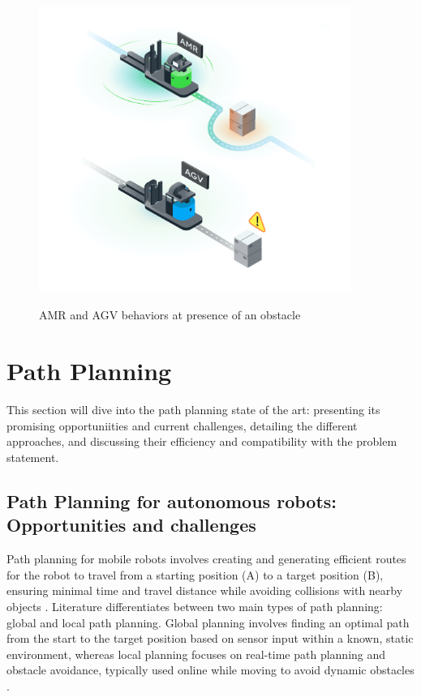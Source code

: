 \begin{figure}[H]
    \begin{center}
       \includegraphics[width=4in]{images/Chap1/AMR-VS-AGV.png}\\
       \caption{AMR and AGV behaviors at presence of an obstacle \cite{R9}}
       \label{AMR-VS-AGV}
       \end{center}
\end{figure}


\newpage
\section{Path Planning}
This section will dive into the path planning state of the art: presenting its promising 
opportuniities and current challenges, detailing the different approaches, and discussing
their efficiency and compatibility with the problem statement.

\subsection{Path Planning for autonomous robots: Opportunities and challenges}
Path planning for mobile robots involves creating and generating efficient routes 
for the robot to travel from a starting position (A) to a target position (B), 
ensuring minimal time and travel distance while avoiding collisions with nearby objects \cite{R7}. Literature 
differentiates between two main types of path planning: 
global and local path planning. Global planning involves finding an optimal path from 
the start to the target position based on sensor input within a known, static environment, 
whereas local planning focuses on real-time path planning and obstacle avoidance, typically used online while 
moving to avoid dynamic obstacles \cite{R11}.

